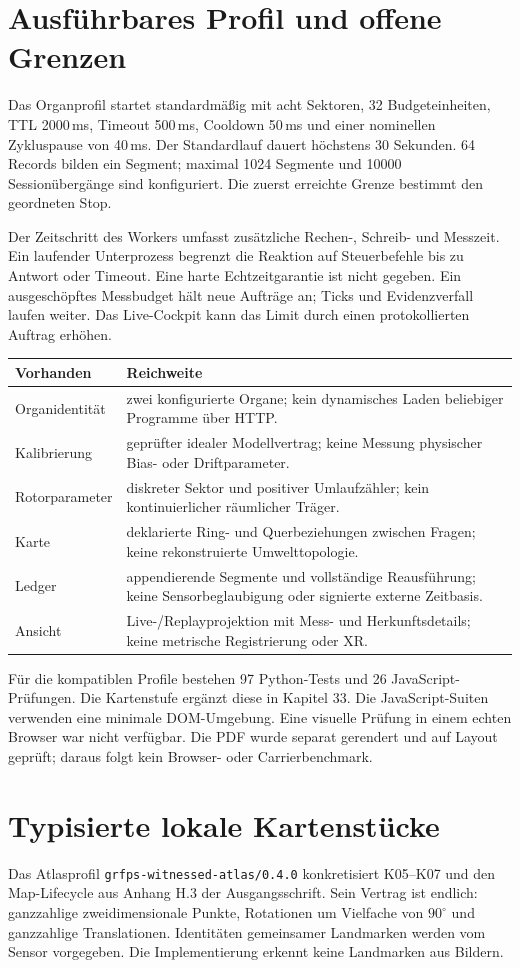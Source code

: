 \documentclass[11pt,a4paper]{article}
\newcommand{\nextsection}[2]{\clearpage{\color{accent}\small\textsf{#1}}\section{#2}}
\begin{document}
\nextsection{28 / BETRIEBSREICHWEITE}{Ausführbares Profil und offene Grenzen}
Das Organprofil startet standardmäßig mit acht Sektoren,
32 Budgeteinheiten, TTL 2000\,ms, Timeout 500\,ms,
Cooldown 50\,ms und einer nominellen Zykluspause von 40\,ms.
Der Standardlauf dauert höchstens 30 Sekunden.
64 Records bilden ein Segment; maximal 1024 Segmente und
10000 Sessionübergänge sind konfiguriert.
Die zuerst erreichte Grenze bestimmt den geordneten Stop.

Der Zeitschritt des Workers umfasst zusätzliche Rechen-,
Schreib- und Messzeit. Ein laufender Unterprozess begrenzt
die Reaktion auf Steuerbefehle bis zu Antwort oder Timeout.
Eine harte Echtzeitgarantie ist nicht gegeben.
Ein ausgeschöpftes Messbudget hält neue Aufträge an;
Ticks und Evidenzverfall laufen weiter. Das Live-Cockpit
kann das Limit durch einen protokollierten Auftrag erhöhen.

\begin{tabularx}{\linewidth}{@{}lY@{}}
\toprule
Vorhanden & Reichweite\\\midrule
Organidentität & zwei konfigurierte Organe; kein dynamisches Laden
beliebiger Programme über HTTP.\\
Kalibrierung & geprüfter idealer Modellvertrag; keine Messung
physischer Bias- oder Driftparameter.\\
Rotorparameter & diskreter Sektor und positiver Umlaufzähler;
kein kontinuierlicher räumlicher Träger.\\
Karte & deklarierte Ring- und Querbeziehungen zwischen Fragen;
keine rekonstruierte Umwelttopologie.\\
Ledger & appendierende Segmente und vollständige Reausführung;
keine Sensorbeglaubigung oder signierte externe Zeitbasis.\\
Ansicht & Live-/Replayprojektion mit Mess- und Herkunftsdetails;
keine metrische Registrierung oder XR.\\
\bottomrule
\end{tabularx}

Für die kompatiblen Profile bestehen 97 Python-Tests und
26 JavaScript-Prüfungen. Die Kartenstufe ergänzt diese in Kapitel 33.
Die JavaScript-Suiten verwenden eine minimale DOM-Umgebung.
Eine visuelle Prüfung in einem echten Browser war nicht
verfügbar. Die PDF wurde separat gerendert und auf Layout
geprüft; daraus folgt kein Browser- oder Carrierbenchmark.

\nextsection{29 / MESSFENSTER}{Typisierte lokale Kartenstücke}
Das Atlasprofil \texttt{grfps-witnessed-atlas/0.4.0} konkretisiert
K05--K07 und den Map-Lifecycle aus Anhang H.3 der Ausgangsschrift.
Sein Vertrag ist endlich: ganzzahlige zweidimensionale Punkte,
Rotationen um Vielfache von $90^\circ$ und ganzzahlige Translationen.
Identitäten gemeinsamer Landmarken werden vom Sensor vorgegeben.
Die Implementierung erkennt keine Landmarken aus Bildern.
\end{document}
